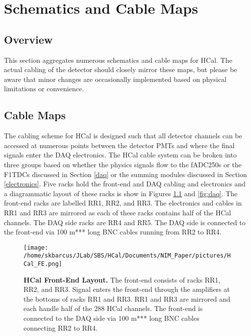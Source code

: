 \documentclass[oneside]{book}   %
\begin{document}
\chapter{Schematics and Cable Maps}
\label{ch:schematics}

\section{Overview}
\label{sec:schematics_overview}

This section aggregates numerous schematics and cable maps for HCal. The actual cabling of the detector should closely mirror these maps, but please be aware that minor changes are occasionally implemented based on physical limitations or convenience. 

\section{Cable Maps}
\label{sec:cable_maps}

The cabling scheme for HCal is designed such that all detector channels can be accessed at numerous points between the detector PMTs and where the final signals enter the DAQ electronics. The HCal cable system can be broken into three groups based on whether the physics signals flow to the fADC250s or the F1TDCs discussed in Section \ref{daq} or the summing modules discussed in Section \ref{electronics}. Five racks hold the front-end and DAQ cabling and electronics and a diagrammatic layout of these racks is show in Figures \ref{fig:fe} and \ref{fig:daq}. The front-end racks are labelled RR1, RR2, and RR3. The electronics and cables in RR1 and RR3 are mirrored as each of these racks contains half of the HCal channels. The DAQ side racks are RR4 and RR5. The DAQ side is connected to the front-end via 100 m*** long BNC cables running from RR2 to RR4. \\ 

	\begin{figure}[!ht]
	\begin{center}
	\texttt{[image: /home/skbarcus/JLab/SBS/HCal/Documents/NIM\_Paper/pictures/HCal\_FE.png]}
	\end{center}
	\caption{
	{\bf{HCal Front-End Layout.}} The front-end consists of racks RR1, RR2, and RR3. Signal enters the front-end through the amplifiers at the bottoms of racks RR1 and RR3. RR1 and RR3 are mirrored and each handle half of the 288 HCal channels. The front-end is connected to the DAQ side via 100 m*** long BNC cables connecting RR2 to RR4.}
	\label{fig:fe}
	\end{figure}	
	
\end{document}
